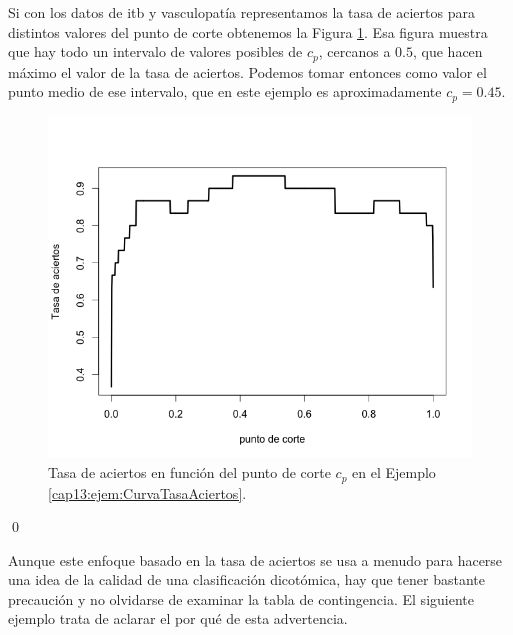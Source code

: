 \begin{ejemplo}
\label{cap13:ejem:CurvaTasaAciertos}
Si con los datos de itb y vasculopatía representamos la tasa de aciertos para distintos valores  del punto de corte obtenemos
la Figura \ref{cap13:fig:TasaAciertosVsPuntoCorte}. Esa figura muestra que hay todo un intervalo de valores posibles de $c_p$, cercanos a $0.5$, que hacen máximo el valor de la tasa de aciertos. Podemos tomar entonces como valor el punto medio de ese intervalo, que en este ejemplo es aproximadamente $c_p = 0.45$.

	\begin{figure}[h!]
		\begin{center}
			\includegraphics[width=13cm]{../fig/Cap13-TasaAciertosVsPuntoCorte.png}
			\caption{Tasa de aciertos en función del punto de corte $c_p$ en el Ejemplo \ref{cap13:ejem:CurvaTasaAciertos}. }
			\label{cap13:fig:TasaAciertosVsPuntoCorte}
		\end{center}
	\end{figure}

\qed		
\end{ejemplo}
Aunque este enfoque basado en la tasa de aciertos se usa a menudo para hacerse una idea de la calidad de una clasificación dicotómica, hay que tener bastante precaución y no olvidarse de examinar la tabla de contingencia. El siguiente ejemplo trata de aclarar el por qué de esta advertencia.
